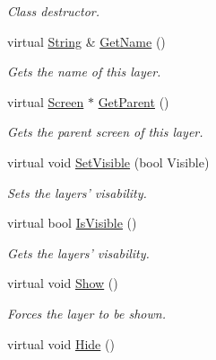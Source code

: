 \begin{DoxyCompactItemize}
\begin{DoxyCompactList}\small\item\em Class destructor. \item\end{DoxyCompactList}\item 
virtual \hyperlink{namespacephys_aa03900411993de7fbfec4789bc1d392e}{String} \& \hyperlink{classphys_1_1UI_1_1Layer_a362edb47fdc9aa595dcaffc1ed617ae4}{GetName} ()
\begin{DoxyCompactList}\small\item\em Gets the name of this layer. \item\end{DoxyCompactList}\item 
virtual \hyperlink{classphys_1_1UI_1_1Screen}{Screen} $\ast$ \hyperlink{classphys_1_1UI_1_1Layer_a484d10cf74177dea47d00ad7ddef8527}{GetParent} ()
\begin{DoxyCompactList}\small\item\em Gets the parent screen of this layer. \item\end{DoxyCompactList}\item 
virtual void \hyperlink{classphys_1_1UI_1_1Layer_a421ed59dd2f50bed32a9e32c03327c39}{SetVisible} (bool Visible)
\begin{DoxyCompactList}\small\item\em Sets the layers' visability. \item\end{DoxyCompactList}\item 
virtual bool \hyperlink{classphys_1_1UI_1_1Layer_a33f23515b8ac60adc2e99435574a2d9d}{IsVisible} ()
\begin{DoxyCompactList}\small\item\em Gets the layers' visability. \item\end{DoxyCompactList}\item 
\hypertarget{classphys_1_1UI_1_1Layer_ad8828d0c891ebbb9d7b9ca112793c725}{
virtual void \hyperlink{classphys_1_1UI_1_1Layer_ad8828d0c891ebbb9d7b9ca112793c725}{Show} ()}
\label{classphys_1_1UI_1_1Layer_ad8828d0c891ebbb9d7b9ca112793c725}

\begin{DoxyCompactList}\small\item\em Forces the layer to be shown. \item\end{DoxyCompactList}\item 
\hypertarget{classphys_1_1UI_1_1Layer_ad69fc503170e52b2248f76a87f57a2b8}{
virtual void \hyperlink{classphys_1_1UI_1_1Layer_ad69fc503170e52b2248f76a87f57a2b8}{Hide} ()}
\label{classphys_1_1UI_1_1Layer_ad69fc503170e52b2248f76a87f57a2b8}


\end{DoxyCompactItemize}
